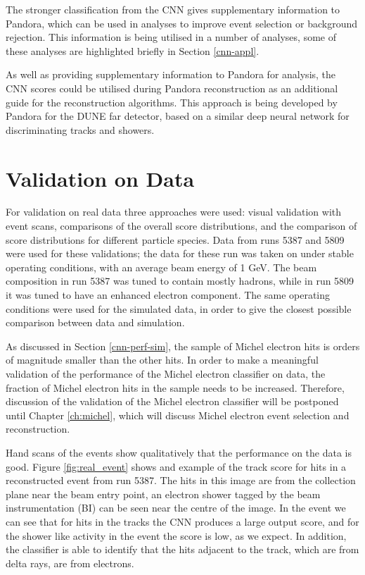 The stronger classification from the CNN gives supplementary information to
Pandora, which can be used in analyses to improve event selection or background
rejection. This information is being utilised in a number of \protodune{}
analyses, some of these analyses are highlighted briefly in Section
\ref{cnn-appl}.

As well as providing supplementary information to Pandora for analysis, the CNN
scores could be utilised during Pandora reconstruction as an additional guide
for the reconstruction algorithms. This approach is being developed by Pandora
for the DUNE far detector, based on a similar deep neural network for 
discriminating tracks and showers\cite{TODO:Neutrino2020Poster}.

\section{Validation on \protodune{} Data} \label{cnn-perf-data}

For validation on real \protodune{} data three approaches were used: visual
validation with event scans, comparisons of the overall score distributions, 
and the comparison of score distributions for different particle species. Data 
from \protodune{} runs 5387 and 5809 were used for these validations; the data 
for these run was taken on under stable operating conditions, with an average 
beam energy of 1 GeV. The beam composition in run 5387 was tuned to contain
mostly hadrons, while in run 5809 it was tuned to have an enhanced electron
component. The same operating conditions were used for the simulated data, in
order to give the closest possible comparison between data and simulation.

As discussed in Section \ref{cnn-perf-sim}, the sample of Michel electron hits
is orders of magnitude smaller than the other hits. In order to make a
meaningful validation of the performance of the Michel electron classifier on
data, the fraction of Michel electron hits in the sample needs to be increased.
Therefore, discussion of the validation of the Michel electron classifier will 
be postponed until Chapter \ref{ch:michel}, which will discuss Michel electron 
event selection and reconstruction.

Hand scans of the events show qualitatively that the performance on the data is
good. Figure \ref{fig:real_event} shows and example of the track score for hits
in a reconstructed event from run 5387. The hits in this image are from the
collection plane near the beam entry point, an electron shower tagged by the
beam instrumentation (BI) can be seen near the centre of the image. In the event
we can see that for hits in the tracks the CNN produces a large output score,
and for the shower like activity in the event the score is low, as we expect. In
addition, the classifier is able to identify that the hits adjacent to the 
track, which are from delta rays, are from electrons.

